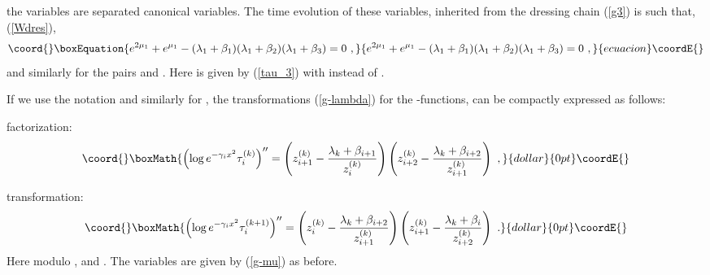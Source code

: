 \documentclass[a4paper,11pt]{article}
\begin{document}
the variables \coordHE{} are separated
canonical variables. The time evolution of these variables, inherited from the dressing
chain (\ref{g3}) is such that, (\ref{Wdres}),
\begin{equation}\coord{}\boxEquation{
\label{W}
e^{2\mu_1} +  e^{\mu_1}-(\lambda_1+\beta_1)(\lambda_1+\beta_2)(\lambda_1+\beta_3)= 0~,
}{
e^{2\mu_1} +  e^{\mu_1}-(\lambda_1+\beta_1)(\lambda_1+\beta_2)(\lambda_1+\beta_3)= 0~,
}{ecuacion}\coordE{}\end{equation}
and similarly for the pairs \coordHE{} and \coordHE{}.
Here \coordHE{} is given by (\ref{tau_3}) with \coordHE{} instead of \coordHE{}.

If we use the notation
\coordHE{}
and similarly for \coordHE{},
the transformations (\ref{g-lambda}) for the \myHighlight{$\tau$}\coordHE{} -functions, can be compactly
expressed as follows:

factorization:
    $$\coord{}\boxMath{
    \left( \log e^{-\gamma_i x^2} \tau_i^{(k)} \right) ''
    = \left( z_{i+1}^{(k)} - \frac{\lambda_k + \beta_{i+1}}{z_i^{(k)}} \right)
      \left( z_{i+2}^{(k)} - \frac{\lambda_k + \beta_{i+2}}{z_{i+1}^{(k)}} \right)~,
    }{dollar}{0pt}\coordE{}$$

transformation:
    $$\coord{}\boxMath{
    \left( \log e^{-\gamma_i x^2} \tau_i^{(k+1)} \right) ''
    = \left( z_{i}^{(k)} - \frac{\lambda_k + \beta_{i+2}}{z_{i+1}^{(k)}} \right)
      \left( z_{i+1}^{(k)} - \frac{\lambda_k + \beta_i}{z_{i+2}^{(k)}} \right)~.
    }{dollar}{0pt}\coordE{}$$
Here \coordHE{} modulo \coordHE{}, and \coordHE{}.
The variables \myHighlight{$\mu$}\coordHE{} are given by (\ref{g-mu}) as before.
\end{document}
